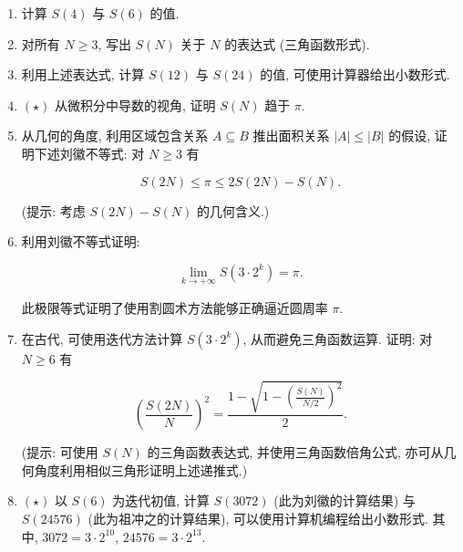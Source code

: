 \begin{enumerate}
    \item[1.]计算 $S(4)$ 与 $S(6)$ 的值.
    \item[2.]对所有 $N \geq 3$, 写出 $S(N)$ 关于 $N$ 的表达式 (三角函数形式).
    \item[3.]利用上述表达式, 计算 $S(12)$ 与 $S(24)$ 的值, 可使用计算器给出小数形式.
    \item[4.]$(\star)$ 从微积分中导数的视角, 证明 $S(N)$ 趋于 $\pi$.
    \item[5.]从几何的角度, 利用区域包含关系 $A \subseteq B$ 推出面积关系 $|A| \leq |B|$ 的假设, 证明下述刘徽不等式: 对 $N \geq 3$ 有

   \[S(2N) \leq \pi \leq 2S(2N) - S(N).\]

    (提示: 考虑 $S(2N) - S(N)$ 的几何含义.)
    \item[6.]利用刘徽不等式证明:

    \[\lim_{k \to +\infty} S(3 \cdot 2^k) = \pi.\]

    此极限等式证明了使用割圆术方法能够正确逼近圆周率 $\pi$.
    \item[7.]在古代, 可使用迭代方法计算 $S(3 \cdot 2^k)$, 从而避免三角函数运算. 证明: 对 $N \geq 6$ 有

    \[\left(\frac{S(2N)}{N}\right)^2 = \frac{1 - \sqrt{1 - \left(\frac{S(N)}{N / 2}\right)^2}}{2}.\]

    (提示: 可使用 $S(N)$ 的三角函数表达式, 并使用三角函数倍角公式, 亦可从几何角度利用相似三角形证明上述递推式.)
    \item[8.]$(\star)$ 以 $S(6)$ 为迭代初值, 计算 $S(3072)$ (此为刘徽的计算结果) 
    与 $S(24576)$ (此为祖冲之的计算结果), 可以使用计算机编程给出小数形式. 
    其中, $3072 = 3 \cdot 2^{10}$, $24576 = 3 \cdot 2^{13}$.
\end{enumerate}